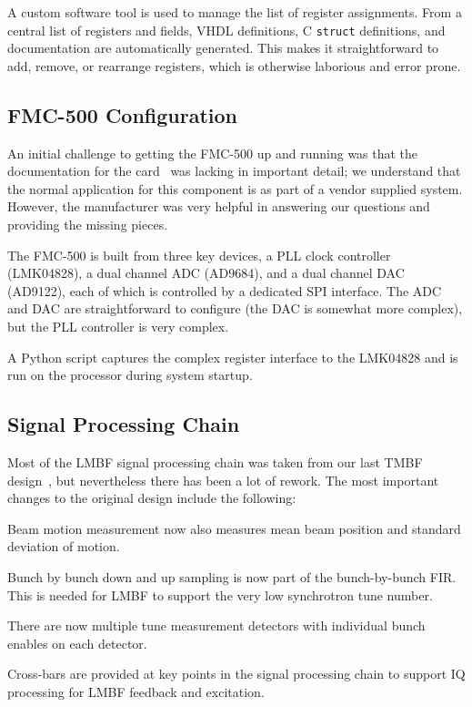 \documentclass[
    a4paper,
    keeplastbox,            %
    hyphens,                %
]{jacow}
\begin{document}
A custom software tool is used to manage the list of register assignments.  From
a central list of registers and fields, VHDL definitions, C \texttt{struct}
definitions, and documentation are automatically generated.  This makes it
straightforward to add, remove, or rearrange registers, which is otherwise
laborious and error prone.


\subsection{FMC-500 Configuration}

An initial challenge to getting the FMC-500 up and running was that the
documentation for the card~\cite{fmc500} was lacking in important detail; we
understand that the normal application for this component is as part of a vendor
supplied system.  However, the manufacturer was very helpful in answering our
questions and providing the missing pieces.

The FMC-500 is built from three key devices, a PLL clock controller (LMK04828),
a dual channel ADC (AD9684), and a dual channel DAC (AD9122), each of which is
controlled by a dedicated SPI interface.  The ADC and DAC are straightforward to
configure (the DAC is somewhat more complex), but the PLL controller is very
complex.

A Python script captures the complex register interface to the LMK04828 and is
run on the processor during system startup.


\subsection{Signal Processing Chain}

Most of the LMBF signal processing chain was taken from our last TMBF
design~\cite{icalepcs2015}, but nevertheless there has been a lot of rework.
The most important changes to the original design include the following:

\begin{Itemize}
\item
    Beam motion measurement now also measures mean beam position and standard
    deviation of motion.
\item
    Bunch by bunch down and up sampling is now part of the bunch-by-bunch FIR.
    This is needed for LMBF to support the very low synchrotron tune number.
\item
    There are now multiple tune measurement detectors with individual bunch
    enables on each detector.
\item
    Cross-bars are provided at key points in the signal processing chain to
    support IQ processing for LMBF feedback and excitation.
\end{Itemize}
\end{document}
